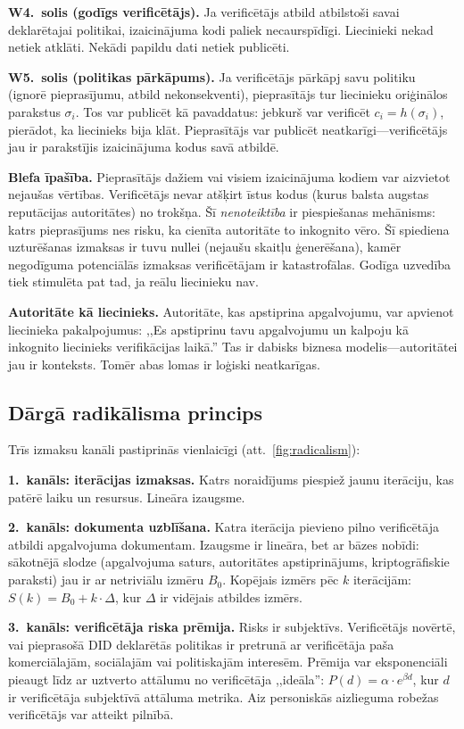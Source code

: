 \documentclass[11pt,a4paper,twocolumn]{article}
\begin{document}
\textbf{W4.\ solis (godīgs verificētājs).} Ja verificētājs atbild atbilstoši savai deklarētajai politikai, izaicinājuma kodi paliek necaurspīdīgi. Liecinieki nekad netiek atklāti. Nekādi papildu dati netiek publicēti.

\textbf{W5.\ solis (politikas pārkāpums).} Ja verificētājs pārkāpj savu politiku (ignorē pieprasījumu, atbild nekonsekventi), pieprasītājs tur liecinieku oriģinālos parakstus $\sigma_i$. Tos var publicēt kā pavaddatus: jebkurš var verificēt $c_i = h(\sigma_i)$, pierādot, ka liecinieks bija klāt. Pieprasītājs var publicēt neatkarīgi---verificētājs jau ir parakstījis izaicinājuma kodus savā atbildē.

\textbf{Blefa īpašība.} Pieprasītājs dažiem vai visiem izaicinājuma kodiem var aizvietot nejaušas vērtības. Verificētājs nevar atšķirt īstus kodus (kurus balsta augstas reputācijas autoritātes) no trokšņa. Šī \emph{nenoteiktība} ir piespiešanas mehānisms: katrs pieprasījums nes risku, ka cienīta autoritāte to inkognito vēro. Šī spiediena uzturēšanas izmaksas ir tuvu nullei (nejaušu skaitļu ģenerēšana), kamēr negodīguma potenciālās izmaksas verificētājam ir katastrofālas. Godīga uzvedība tiek stimulēta pat tad, ja reālu liecinieku nav.

\textbf{Autoritāte kā liecinieks.} Autoritāte, kas apstiprina apgalvojumu, var apvienot liecinieka pakalpojumus: ,,Es apstiprinu tavu apgalvojumu un kalpoju kā inkognito liecinieks verifikācijas laikā.'' Tas ir dabisks biznesa modelis---autoritātei jau ir konteksts. Tomēr abas lomas ir loģiski neatkarīgas.

\subsection{Dārgā radikālisma princips}

Trīs izmaksu kanāli pastiprinās vienlaicīgi (att.~\ref{fig:radicalism}):

\textbf{1.\ kanāls: iterācijas izmaksas.} Katrs noraidījums piespiež jaunu iterāciju, kas patērē laiku un resursus. Lineāra izaugsme.

\textbf{2.\ kanāls: dokumenta uzblīšana.} Katra iterācija pievieno pilno verificētāja atbildi apgalvojuma dokumentam. Izaugsme ir lineāra, bet ar bāzes nobīdi: sākotnējā slodze (apgalvojuma saturs, autoritātes apstiprinājums, kriptogrāfiskie paraksti) jau ir ar netriviālu izmēru $B_0$. Kopējais izmērs pēc $k$ iterācijām: $S(k) = B_0 + k \cdot \Delta$, kur $\Delta$ ir vidējais atbildes izmērs.

\textbf{3.\ kanāls: verificētāja riska prēmija.} Risks ir subjektīvs. Verificētājs novērtē, vai pieprasošā DID deklarētās politikas ir pretrunā ar verificētāja paša komerciālajām, sociālajām vai politiskajām interesēm. Prēmija var eksponenciāli pieaugt līdz ar uztverto attālumu no verificētāja ,,ideāla'': $P(d) = \alpha \cdot e^{\beta d}$, kur $d$ ir verificētāja subjektīvā attāluma metrika. Aiz personiskās aizlieguma robežas verificētājs var atteikt pilnībā.
\end{document}
